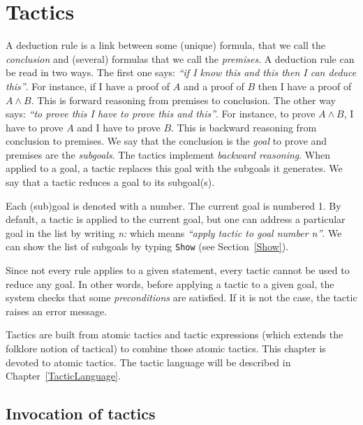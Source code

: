 \chapter{Tactics
\label{Tactics}}

A deduction rule is a link between some (unique) formula, that we call
the {\em conclusion} and (several) formulas that we call the {\em
premises}. A deduction rule can be read in two ways. The first
one says: {\it ``if I know this and this then I can deduce
this''}. For instance, if I have a proof of $A$ and a proof of $B$
then I have a proof of $A \land B$. This is forward reasoning from
premises to conclusion. The other way says: {\it ``to prove this I
have to prove this and this''}. For instance, to prove $A \land B$, I
have to prove $A$ and I have to prove $B$. This is backward reasoning
from conclusion to premises. We say that the conclusion
is the {\em goal} to prove and premises are the {\em
subgoals}.  The tactics implement {\em backward
reasoning}. When applied to a goal, a tactic replaces this goal with
the subgoals it generates. We say that a tactic reduces a goal to its
subgoal(s).

Each (sub)goal is denoted with a number. The current goal is numbered
1. By default, a tactic is applied to the current goal, but one can
address a particular goal in the list by writing {\sl n:\tac} which
means {\it ``apply tactic {\tac} to goal number {\sl n}''}.
We can show the list of subgoals by typing {\tt Show} (see
Section~\ref{Show}).

Since not every rule applies to a given statement, every tactic cannot be
used to reduce any goal. In other words, before applying a tactic to a
given goal, the system checks that some {\em preconditions} are
satisfied. If it is not the case, the tactic raises an error message.

Tactics are built from atomic tactics and tactic expressions (which
extends the folklore notion of tactical) to combine those atomic
tactics. This chapter is devoted to atomic tactics. The tactic
language will be described in Chapter~\ref{TacticLanguage}.

\section{Invocation of tactics
\label{tactic-syntax}
}

